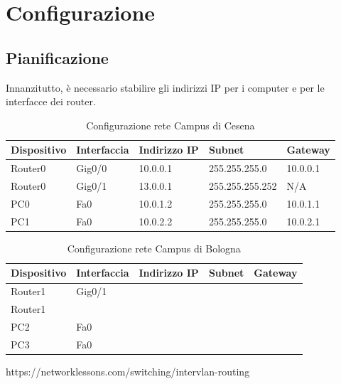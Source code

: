 \documentclass[a4paper,12pt]{report}
\begin{document}
\chapter{Configurazione}
\section{Pianificazione}
Innanzitutto, è necessario stabilire gli indirizzi IP per i computer e per le interfacce dei router.
\begin{table}[]
\begin{tabular}{@{}lllll@{}}
\toprule
Dispositivo & Interfaccia & Indirizzo IP & Subnet & Gateway \\ \midrule
Router0 & Gig0/0 & 10.0.0.1 & 255.255.255.0 & 10.0.0.1 \\
Router0 & Gig0/1 & 13.0.0.1 & 255.255.255.252 & N/A \\
PC0 & Fa0 & 10.0.1.2 & 255.255.255.0 & 10.0.1.1 \\
PC1 & Fa0 & 10.0.2.2 & 255.255.255.0 & 10.0.2.1 \\ \bottomrule
\end{tabular}
\caption{Configurazione rete Campus di Cesena}
\label{table:1}
\end{table}
\begin{table}[]
\begin{tabular}{@{}lllll@{}}
\toprule
Dispositivo & Interfaccia & Indirizzo IP & Subnet & Gateway \\ \midrule
Router1 & Gig0/1 &  &  &  \\
Router1 &  &  &  &  \\
PC2 & Fa0 &  &  &  \\
PC3 & Fa0 &  &  &  \\ \bottomrule
\end{tabular}
\caption{Configurazione rete Campus di Bologna}
\label{table:2}
\end{table}
https://networklessons.com/switching/intervlan-routing
\end{document}

